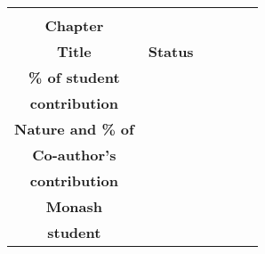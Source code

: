\begin{publicationdeclaration}
{
\footnotesize
\setlength{\tabcolsep}{0.02in}
\begin{longtable}{|c|c|c|c|c|c|}
	\hline
	\rowcolor{black}\begin{tabular}[x]{@{}c@{}}{\color{white}\bf Thesis}\\ {\color{white}\bf Chapter}\end{tabular} & \begin{tabular}[x]{@{}c@{}}{\color{white}\bf Publication}\\ {\color{white}\bf Title}\end{tabular} & {\color{white}\bf Status} & \begin{tabular}[x]{@{}c@{}} {\color{white}\bf Nature and}\\ {\color{white}\bf \% of student}\\ {\color{white}\bf contribution} \end{tabular} & \begin{tabular}[x]{@{}c@{}}{\color{white}\bf Co-author name(s)}\\ {\color{white}\bf Nature and \% of}\\{\color{white}\bf Co-author’s}\\ {\color{white}\bf contribution} \end{tabular} & \begin{tabular}[x]{@{}c@{}} {\color{white}\bf Co-author(s),} \\{\color{white}\bf Monash}\\{\color{white}\bf student}\end{tabular} \\
	\hline

\end{longtable}}
\end{publicationdeclaration}
